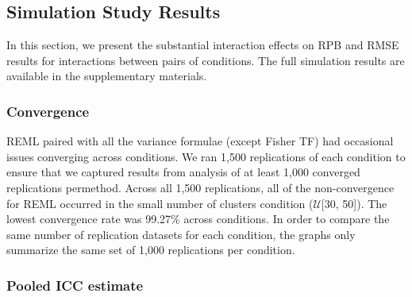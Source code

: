 
\subsection{Simulation Study Results}

In this section, we present the substantial interaction effects on RPB and RMSE results for interactions between pairs of conditions. The full simulation results are available in the supplementary materials. 

\subsubsection{Convergence}

REML paired with all the variance formulae (except Fisher TF) had occasional issues converging across conditions. We ran 1,500 replications of each condition to ensure that we captured results from analysis of at least 1,000 converged replications permethod. Across all 1,500 replications, all of the non-convergence for REML occurred in the small number of clusters condition ($\mathcal{U}$[30, 50]). The lowest convergence rate was 99.27\% across conditions. In order to compare the same number of replication datasets for each condition, the graphs only summarize the same set of 1,000 replications per condition.

\subsubsection{Pooled ICC estimate}

